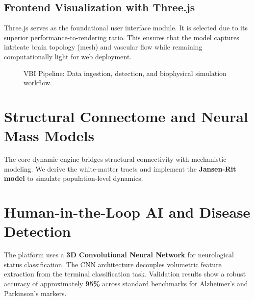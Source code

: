 \documentclass[conference]{IEEEtran}
\begin{document}
\subsection{Frontend Visualization with Three.js}
Three.js serves as the foundational user interface module. It is selected due to its superior performance-to-rendering ratio. This ensures that the model captures intricate brain topology (mesh) and vascular flow while remaining computationally light for web deployment.

\begin{figure}[!t]
\centering
{}
\caption{VBI Pipeline: Data ingestion, detection, and biophysical simulation workflow.}
\label{fig:vbi_pipeline}
\end{figure}

\section{Structural Connectome and Neural Mass Models}
The core dynamic engine bridges structural connectivity with mechanistic modeling. We derive the white-matter tracts and implement the \textbf{Jansen-Rit model} to simulate population-level dynamics.

\section{Human-in-the-Loop AI and Disease Detection}
The platform uses a \textbf{3D Convolutional Neural Network} for neurological status classification. The CNN architecture decouples volumetric feature extraction from the terminal classification task. Validation results show a robust accuracy of approximately \textbf{95\%} across standard benchmarks for Alzheimer's and Parkinson's markers.
\end{document}
